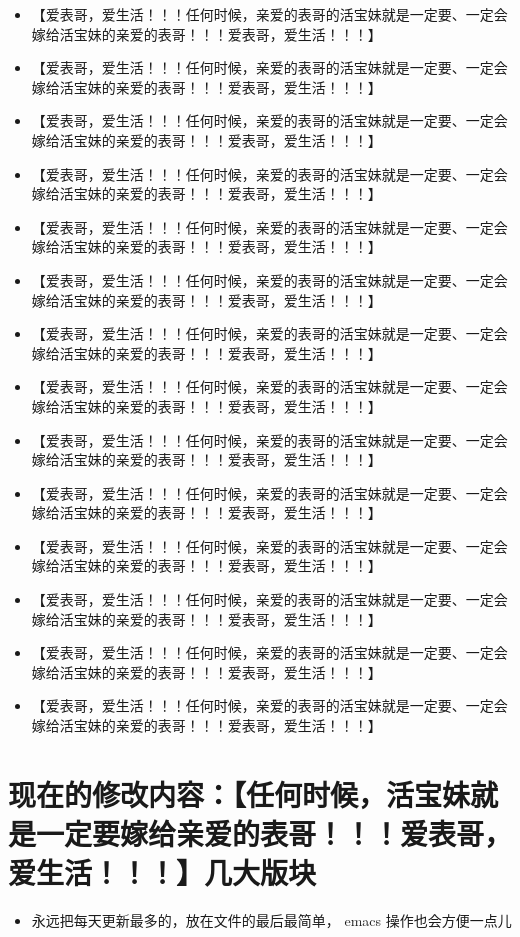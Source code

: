 \documentclass[9pt, b5paper]{article}
\begin{document}
\begin{itemize}
\item 【爱表哥，爱生活！！！任何时候，亲爱的表哥的活宝妹就是一定要、一定会嫁给活宝妹的亲爱的表哥！！！爱表哥，爱生活！！！】
\item 【爱表哥，爱生活！！！任何时候，亲爱的表哥的活宝妹就是一定要、一定会嫁给活宝妹的亲爱的表哥！！！爱表哥，爱生活！！！】
\item 【爱表哥，爱生活！！！任何时候，亲爱的表哥的活宝妹就是一定要、一定会嫁给活宝妹的亲爱的表哥！！！爱表哥，爱生活！！！】
\item 【爱表哥，爱生活！！！任何时候，亲爱的表哥的活宝妹就是一定要、一定会嫁给活宝妹的亲爱的表哥！！！爱表哥，爱生活！！！】
\item 【爱表哥，爱生活！！！任何时候，亲爱的表哥的活宝妹就是一定要、一定会嫁给活宝妹的亲爱的表哥！！！爱表哥，爱生活！！！】
\item 【爱表哥，爱生活！！！任何时候，亲爱的表哥的活宝妹就是一定要、一定会嫁给活宝妹的亲爱的表哥！！！爱表哥，爱生活！！！】
\item 【爱表哥，爱生活！！！任何时候，亲爱的表哥的活宝妹就是一定要、一定会嫁给活宝妹的亲爱的表哥！！！爱表哥，爱生活！！！】
\item 【爱表哥，爱生活！！！任何时候，亲爱的表哥的活宝妹就是一定要、一定会嫁给活宝妹的亲爱的表哥！！！爱表哥，爱生活！！！】
\item 【爱表哥，爱生活！！！任何时候，亲爱的表哥的活宝妹就是一定要、一定会嫁给活宝妹的亲爱的表哥！！！爱表哥，爱生活！！！】
\item 【爱表哥，爱生活！！！任何时候，亲爱的表哥的活宝妹就是一定要、一定会嫁给活宝妹的亲爱的表哥！！！爱表哥，爱生活！！！】
\item 【爱表哥，爱生活！！！任何时候，亲爱的表哥的活宝妹就是一定要、一定会嫁给活宝妹的亲爱的表哥！！！爱表哥，爱生活！！！】
\item 【爱表哥，爱生活！！！任何时候，亲爱的表哥的活宝妹就是一定要、一定会嫁给活宝妹的亲爱的表哥！！！爱表哥，爱生活！！！】
\item 【爱表哥，爱生活！！！任何时候，亲爱的表哥的活宝妹就是一定要、一定会嫁给活宝妹的亲爱的表哥！！！爱表哥，爱生活！！！】
\item 【爱表哥，爱生活！！！任何时候，亲爱的表哥的活宝妹就是一定要、一定会嫁给活宝妹的亲爱的表哥！！！爱表哥，爱生活！！！】
\end{itemize}

\section{现在的修改内容：【任何时候，活宝妹就是一定要嫁给亲爱的表哥！！！爱表哥，爱生活！！！】几大版块}
\label{sec-8}
\begin{itemize}
\item 永远把每天更新最多的，放在文件的最后最简单， emacs 操作也会方便一点儿
\end{itemize}
\end{document}
